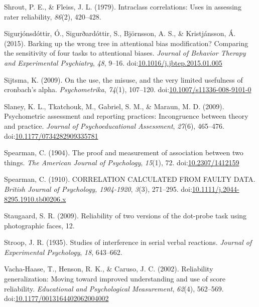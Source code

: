 \documentclass[english,,man,floatsintext]{apa6}
\begin{document}
\leavevmode\hypertarget{ref-shrout_intraclass_1979}{}%
Shrout, P. E., \& Fleiss, J. L. (1979). Intraclass correlations: Uses in assessing rater reliability, \emph{86}(2), 420--428.

\leavevmode\hypertarget{ref-sigurjonsdottir_barking_2015}{}%
Sigurjónsdóttir, Ó., Sigurðardóttir, S., Björnsson, A. S., \& Kristjánsson, Á. (2015). Barking up the wrong tree in attentional bias modification? Comparing the sensitivity of four tasks to attentional biases. \emph{Journal of Behavior Therapy and Experimental Psychiatry}, \emph{48}, 9--16. doi:\href{https://doi.org/10.1016/j.jbtep.2015.01.005}{10.1016/j.jbtep.2015.01.005}

\leavevmode\hypertarget{ref-sijtsma_use_2009}{}%
Sijtsma, K. (2009). On the use, the misuse, and the very limited usefulness of cronbach's alpha. \emph{Psychometrika}, \emph{74}(1), 107--120. doi:\href{https://doi.org/10.1007/s11336-008-9101-0}{10.1007/s11336-008-9101-0}

\leavevmode\hypertarget{ref-slaney_psychometric_2009}{}%
Slaney, K. L., Tkatchouk, M., Gabriel, S. M., \& Maraun, M. D. (2009). Psychometric assessment and reporting practices: Incongruence between theory and practice. \emph{Journal of Psychoeducational Assessment}, \emph{27}(6), 465--476. doi:\href{https://doi.org/10.1177/0734282909335781}{10.1177/0734282909335781}

\leavevmode\hypertarget{ref-spearman_proof_1904}{}%
Spearman, C. (1904). The proof and measurement of association between two things. \emph{The American Journal of Psychology}, \emph{15}(1), 72. doi:\href{https://doi.org/10.2307/1412159}{10.2307/1412159}

\leavevmode\hypertarget{ref-spearman_correlation_1910}{}%
Spearman, C. (1910). CORRELATION CALCULATED FROM FAULTY DATA. \emph{British Journal of Psychology, 1904-1920}, \emph{3}(3), 271--295. doi:\href{https://doi.org/10.1111/j.2044-8295.1910.tb00206.x}{10.1111/j.2044-8295.1910.tb00206.x}

\leavevmode\hypertarget{ref-staugaard_reliability_2009}{}%
Staugaard, S. R. (2009). Reliability of two versions of the dot-probe task using photographic faces, 12.

\leavevmode\hypertarget{ref-stroop_studies_1935}{}%
Stroop, J. R. (1935). Studies of interference in serial verbal reactions. \emph{Journal of Experimental Psychology}, \emph{18}, 643--662.

\leavevmode\hypertarget{ref-vacha-haase_reliability_2002}{}%
Vacha-Haase, T., Henson, R. K., \& Caruso, J. C. (2002). Reliability generalization: Moving toward improved understanding and use of score reliability. \emph{Educational and Psychological Measurement}, \emph{62}(4), 562--569. doi:\href{https://doi.org/10.1177/0013164402062004002}{10.1177/0013164402062004002}
\end{document}
